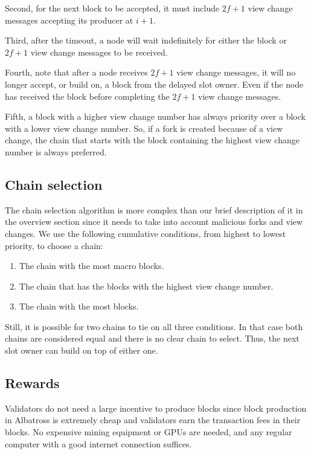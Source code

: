 \documentclass[conference]{IEEEtran}
\begin{document}
Second, for the next block to be accepted, it must include $2f+1$ view change messages accepting its producer at $i+1$.

Third, after the timeout, a node will wait indefinitely for either the block or $2f+1$ view change messages to be received.

Fourth, note that after a node receives $2f+1$ view change messages, it will no longer accept, or build on, a block from the delayed slot owner. Even if the node has received the block before completing the $2f+1$ view change messages.

Fifth, a block with a higher view change number has always priority over a block with a lower view change number. So, if a fork is created because of a view change, the chain that starts with the block containing the highest view change number is always preferred.

\subsection{Chain selection}
The chain selection algorithm is more complex than our brief description of it in the overview section since it needs to take into account malicious forks and view changes. We use the following cumulative conditions, from highest to lowest priority, to choose a chain:

\begin{enumerate}
	\item The chain with the most macro blocks.
	\item The chain that has the blocks with the highest view change number.
	\item The chain with the most blocks.
\end{enumerate}

Still, it is possible for two chains to tie on all three conditions. In that case both chains are considered equal and there is no clear chain to select. Thus, the next slot owner can build on top of either one.

\subsection{Rewards}
Validators do not need a large incentive to produce blocks since block production in Albatross is extremely cheap and validators earn the transaction fees in their blocks. No expensive mining equipment or GPUs are needed, and any regular computer with a good internet connection suffices.
\end{document}
